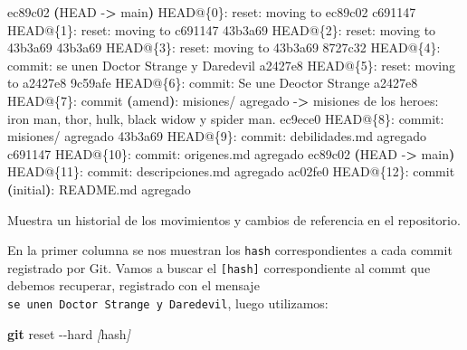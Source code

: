 \documentclass[
]{book}
\newenvironment{Shaded}{\begin{snugshade}}{\end{snugshade}}
\newcommand{\AttributeTok}[1]{\textcolor[rgb]{0.13,0.29,0.53}{#1}}
\newcommand{\BuiltInTok}[1]{#1}
\newcommand{\ErrorTok}[1]{\textcolor[rgb]{0.64,0.00,0.00}{\textbf{#1}}}
\newcommand{\ExtensionTok}[1]{#1}
\newcommand{\FunctionTok}[1]{\textcolor[rgb]{0.13,0.29,0.53}{\textbf{#1}}}
\newcommand{\KeywordTok}[1]{\textcolor[rgb]{0.13,0.29,0.53}{\textbf{#1}}}
\newcommand{\NormalTok}[1]{#1}
\newcommand{\OperatorTok}[1]{\textcolor[rgb]{0.81,0.36,0.00}{\textbf{#1}}}
\newcommand{\PreprocessorTok}[1]{\textcolor[rgb]{0.56,0.35,0.01}{\textit{#1}}}
\newcommand{\SpecialStringTok}[1]{\textcolor[rgb]{0.31,0.60,0.02}{#1}}
\begin{document}
\begin{Shaded}
\begin{Highlighting}[]
\ExtensionTok{ec89c02} \ErrorTok{(}\ExtensionTok{HEAD} \AttributeTok{{-}}\OperatorTok{\textgreater{}}\NormalTok{ main}\KeywordTok{)} \ExtensionTok{HEAD@\{0\}:}\NormalTok{ reset: moving to ec89c02}
\ExtensionTok{c691147}\NormalTok{ HEAD@\{1\}: reset: moving to c691147}
\ExtensionTok{43b3a69}\NormalTok{ HEAD@\{2\}: reset: moving to 43b3a69}
\ExtensionTok{43b3a69}\NormalTok{ HEAD@\{3\}: reset: moving to 43b3a69}
\ExtensionTok{8727c32}\NormalTok{ HEAD@\{4\}: commit: se unen Doctor Strange y Daredevil}
\ExtensionTok{a2427e8}\NormalTok{ HEAD@\{5\}: reset: moving to a2427e8}
\ExtensionTok{9c59afe}\NormalTok{ HEAD@\{6\}: commit: Se une Deoctor Strange}
\ExtensionTok{a2427e8}\NormalTok{ HEAD@\{7\}: commit }\ErrorTok{(}\ExtensionTok{amend}\KeywordTok{)}\BuiltInTok{:}\NormalTok{ misiones/ agregado }\AttributeTok{{-}}\OperatorTok{\textgreater{}}\NormalTok{ misiones de los heroes: iron man, thor, hulk, black widow y spider man.}
\ExtensionTok{ec9ece0}\NormalTok{ HEAD@\{8\}: commit: misiones/ agregado}
\ExtensionTok{43b3a69}\NormalTok{ HEAD@\{9\}: commit: debilidades.md agregado}
\ExtensionTok{c691147}\NormalTok{ HEAD@\{10\}: commit: origenes.md agregado}
\ExtensionTok{ec89c02} \ErrorTok{(}\ExtensionTok{HEAD} \AttributeTok{{-}}\OperatorTok{\textgreater{}}\NormalTok{ main}\KeywordTok{)} \ExtensionTok{HEAD@\{11\}:}\NormalTok{ commit: descripciones.md agregado}
\ExtensionTok{ac02fe0}\NormalTok{ HEAD@\{12\}: commit }\ErrorTok{(}\ExtensionTok{initial}\KeywordTok{)}\BuiltInTok{:}\NormalTok{ README.md agregado}
\end{Highlighting}
\end{Shaded}

Muestra un historial de los movimientos y cambios de referencia en el repositorio.

En la primer columna se nos muestran los \texttt{hash} correspondientes a cada commit registrado por Git. Vamos a buscar el \texttt{{[}hash{]}} correspondiente al commt que debemos recuperar, registrado con el mensaje \texttt{se\ unen\ Doctor\ Strange\ y\ Daredevil}, luego utilizamos:

\begin{Shaded}
\begin{Highlighting}[]
\FunctionTok{git}\NormalTok{ reset }\AttributeTok{{-}{-}hard} \PreprocessorTok{[}\SpecialStringTok{hash}\PreprocessorTok{]}
\end{Highlighting}
\end{Shaded}
\end{document}

